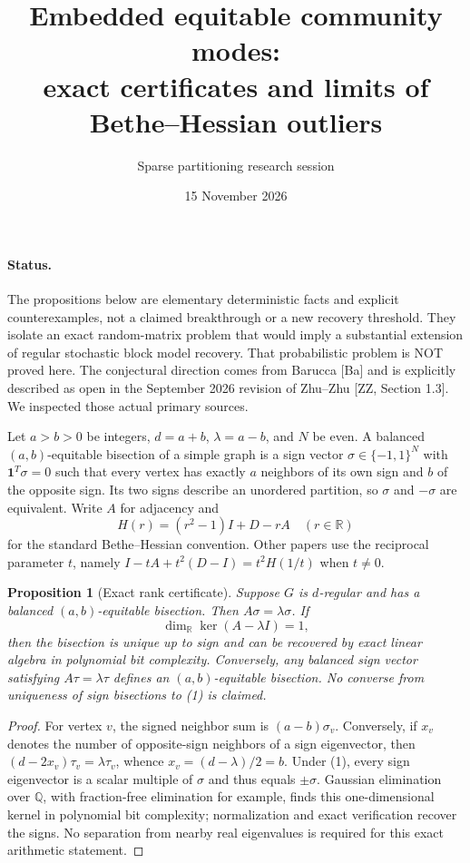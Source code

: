 \documentclass[11pt]{article}
\title{Embedded equitable community modes:\\exact certificates and limits of Bethe--Hessian outliers}
\author{Sparse partitioning research session}
\date{15 November 2026}
\newtheorem{proposition}{Proposition}
\newcommand{\one}{\mathbf 1}
\newcommand{\R}{\mathbb R}
\begin{document}
\maketitle

\paragraph{Status.}
The propositions below are elementary deterministic facts and explicit
counterexamples, not a claimed breakthrough or a new recovery threshold.
They isolate an exact random-matrix problem that would imply a substantial
extension of regular stochastic block model recovery. That probabilistic
problem is NOT proved here. The conjectural direction comes from Barucca
[Ba] and is explicitly described as open in the September 2026 revision
of Zhu--Zhu [ZZ, Section 1.3]. We inspected those actual primary sources.

Let $a>b>0$ be integers, $d=a+b$, $\lambda=a-b$, and $N$ be even.
A balanced $(a,b)$-equitable bisection of a simple graph is a sign vector
$\sigma\in\{-1,1\}^N$ with $\one^T\sigma=0$ such that every vertex
has exactly $a$ neighbors of its own sign and $b$ of the opposite sign.
Its two signs describe an unordered partition, so $\sigma$ and $-\sigma$
are equivalent. Write $A$ for adjacency and
\[
 H(r)=(r^2-1)I+D-rA
 \quad(r\in\R)
\]
for the standard Bethe--Hessian convention. Other papers use the reciprocal
parameter $t$, namely $I-tA+t^2(D-I)=t^2H(1/t)$ when $t\ne0$.

\begin{proposition}[Exact rank certificate]
Suppose $G$ is $d$-regular and has a balanced $(a,b)$-equitable bisection.
Then $A\sigma=\lambda\sigma$. If
\[
 \dim_{\R}\ker(A-\lambda I)=1,                 \tag{1}
\]
then the bisection is unique up to sign and can be recovered by exact
linear algebra in polynomial bit complexity. Conversely, any balanced
sign vector satisfying $A\tau=\lambda\tau$ defines an $(a,b)$-equitable
bisection. No converse from uniqueness of sign bisections to (1) is claimed.
\end{proposition}
\begin{proof}
For vertex $v$, the signed neighbor sum is $(a-b)\sigma_v$.
Conversely, if $x_v$ denotes the number of opposite-sign neighbors of a
sign eigenvector, then $(d-2x_v)\tau_v=\lambda\tau_v$, whence
$x_v=(d-\lambda)/2=b$. Under (1), every sign eigenvector is a scalar
multiple of $\sigma$ and thus equals $\pm\sigma$. Gaussian elimination
over $\mathbb Q$, with fraction-free elimination for example, finds this
one-dimensional kernel in polynomial bit complexity; normalization and
exact verification recover the signs. No separation from nearby real
eigenvalues is required for this exact arithmetic statement.
\end{proof}
\end{document}

